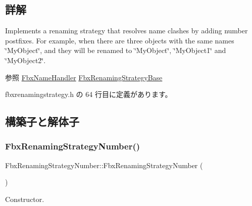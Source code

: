 \subsection{詳解}
Implements a renaming strategy that resolves name clashes by adding number postfixes. For example, when there are three objects with the same names \char`\"{}\+My\+Object\char`\"{}, and they will be renamed to \char`\"{}\+My\+Object\char`\"{}, \char`\"{}\+My\+Object1\char`\"{} and \char`\"{}\+My\+Object2\char`\"{}.

\begin{DoxySeeAlso}{参照}
\hyperlink{class_fbx_name_handler}{Fbx\+Name\+Handler} \hyperlink{class_fbx_renaming_strategy_base}{Fbx\+Renaming\+Strategy\+Base} 
\end{DoxySeeAlso}


 fbxrenamingstrategy.\+h の 64 行目に定義があります。



\subsection{構築子と解体子}
\mbox{\label{class_fbx_renaming_strategy_number_a804b86f501a15158ce4c8b6b065e682d}} 
\subsubsection{\texorpdfstring{Fbx\+Renaming\+Strategy\+Number()}{FbxRenamingStrategyNumber()}}
{\footnotesize\ttfamily Fbx\+Renaming\+Strategy\+Number\+::\+Fbx\+Renaming\+Strategy\+Number (\begin{DoxyParamCaption}{ }\end{DoxyParamCaption})}



Constructor. 

\mbox{\label{class_fbx_renaming_strategy_number_a1ad543ecf2a3fe15324dd01f69c35ac1}} 
